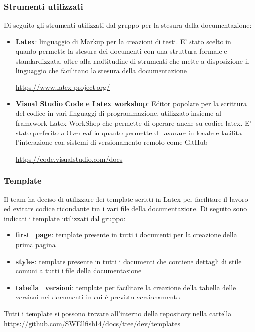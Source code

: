 \documentclass[12pt]{article}
\begin{document}
\subsubsection{Strumenti utilizzati}
Di seguito gli strumenti utilizzati dal gruppo per la stesura della documentazione:
\begin{itemize}
    \item \textbf{Latex}: linguaggio di Markup per la creazioni di testi. E' stato scelto in quanto permette la stesura dei documenti con una struttura formale e standardizzata, oltre alla moltitudine di strumenti che mette a disposizione il linguaggio che facilitano la stesura della documentazione
    \begin{center}
        \url{https://www.latex-project.org/}
    \end{center}
    \item \textbf{Visual Studio Code e Latex workshop}: Editor popolare per la scrittura del codice in vari linguaggi di programmazione, utilizzato insieme al framework Latex WorkShop che permette di operare anche su codice latex. E' stato preferito a Overleaf in quanto permette di lavorare in locale e facilita l'interazione con sistemi di versionamento remoto come GitHub
    \begin{center}  
        \url{https://code.visualstudio.com/docs}
    \end{center}
\end{itemize}


\subsubsection{Template}
Il team ha deciso di utilizzare dei template scritti in Latex per facilitare il lavoro ed evitare codice ridondante tra i vari file della documentazione.
Di seguito sono indicati i template utilizzati dal gruppo:
\begin{itemize}
    \item \textbf{first\_page}: template presente in tutti i documenti per la creazione della prima pagina
    \item \textbf{styles}: template presente in tutti i documenti che contiene dettagli di stile comuni a tutti i file della documentazione
    \item \textbf{tabella\_versioni}: template per facilitare la creazione della tabella delle versioni nei documenti in cui è previsto versionamento.
    
\end{itemize}
Tutti i template si possono trovare all'interno della repository nella cartella \url{https://github.com/SWEllfish14/docs/tree/dev/templates}
\end{document}
